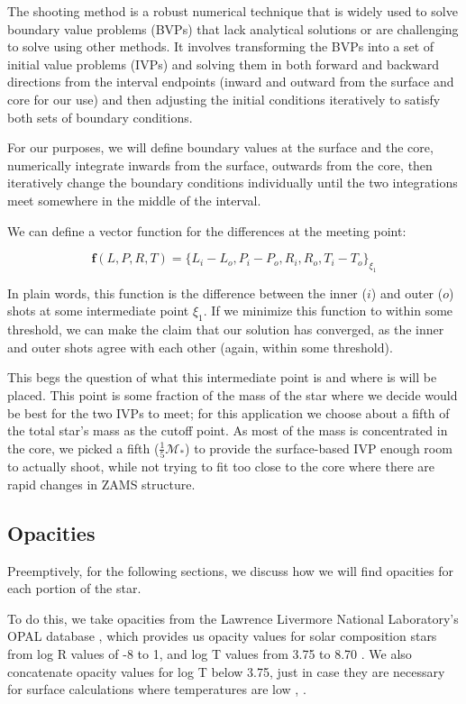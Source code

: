 \documentclass[twocolumn]{aastex631}
\begin{document}
The shooting method is a robust numerical technique that is widely used to solve boundary value problems (BVPs) that lack analytical solutions or are challenging to solve using other methods.  It involves transforming the BVPs into a set of initial value problems (IVPs) and solving them in both forward and backward directions from the interval endpoints (inward and outward from the surface and core for our use) and then adjusting the initial conditions iteratively to satisfy both sets of boundary conditions. 

For our purposes, we will define boundary values at the surface and the core, numerically integrate inwards from the surface, outwards from the core, then iteratively change the boundary conditions individually until the two integrations meet somewhere in the middle of the interval. 

We can define a vector function for the differences at the meeting point:

\begin{equation}
	\label{eqn:diff}
	\textbf{f}(L, P, R, T) = \{ L_i - L_o, P_i - P_o, R_i, R_o, T_i - T_o \}_{\xi_1}
\end{equation}

\noindent In plain words, this function is the difference between the inner ($i$) and outer ($o$) shots at some intermediate point $\xi_1$. If we minimize this function to within some threshold, we can make the claim that our solution has converged, as the inner and outer shots agree with each other (again, within some threshold).

This begs the question of what this intermediate point is and where is will be placed. This point is some fraction of the mass of the star where we decide would be best for the two IVPs to meet; for this application we choose about a fifth of the total star's mass as the cutoff point. As most of the mass is concentrated in the core, we picked a fifth ($\frac{1}{5}\mathcal{M}_*$) to provide the surface-based IVP enough room to actually shoot, while not trying to fit too close to the core where there are rapid changes in ZAMS structure.


\subsection{Opacities}

Preemptively, for the following sections, we discuss how we will find opacities for each portion of the star. 

To do this, we take opacities from the Lawrence Livermore National Laboratory's OPAL database \citep{opal}, which provides us opacity values for solar composition stars from log R values of -8 to 1, and log T values from 3.75 to 8.70 \citep{opacities}. We also concatenate opacity values for log T below 3.75, just in case they are necessary for surface calculations where temperatures are low \citep{asplund}, \citep{lowt}.
\end{document}
